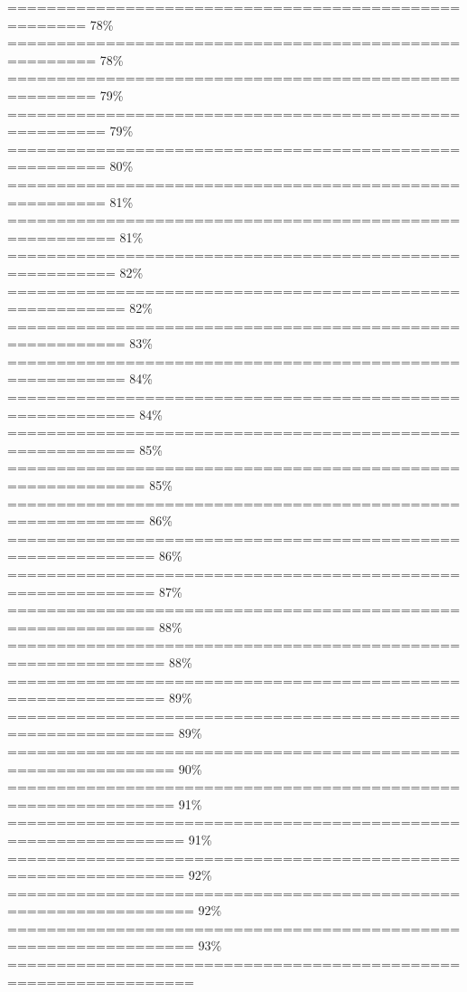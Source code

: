 \documentclass[
]{article}
\begin{document}
\textbar======================================================
\textbar{} 78\% \textbar{}
\textbar=======================================================
\textbar{} 78\% \textbar{}
\textbar=======================================================
\textbar{} 79\% \textbar{}
\textbar========================================================
\textbar{} 79\% \textbar{}
\textbar========================================================
\textbar{} 80\% \textbar{}
\textbar========================================================
\textbar{} 81\% \textbar{}
\textbar=========================================================
\textbar{} 81\% \textbar{}
\textbar=========================================================
\textbar{} 82\% \textbar{}
\textbar==========================================================
\textbar{} 82\% \textbar{}
\textbar==========================================================
\textbar{} 83\% \textbar{}
\textbar==========================================================
\textbar{} 84\% \textbar{}
\textbar===========================================================
\textbar{} 84\% \textbar{}
\textbar===========================================================
\textbar{} 85\% \textbar{}
\textbar============================================================
\textbar{} 85\% \textbar{}
\textbar============================================================
\textbar{} 86\% \textbar{}
\textbar=============================================================
\textbar{} 86\% \textbar{}
\textbar=============================================================
\textbar{} 87\% \textbar{}
\textbar=============================================================
\textbar{} 88\% \textbar{}
\textbar==============================================================
\textbar{} 88\% \textbar{}
\textbar==============================================================
\textbar{} 89\% \textbar{}
\textbar===============================================================
\textbar{} 89\% \textbar{}
\textbar===============================================================
\textbar{} 90\% \textbar{}
\textbar===============================================================
\textbar{} 91\% \textbar{}
\textbar================================================================
\textbar{} 91\% \textbar{}
\textbar================================================================
\textbar{} 92\% \textbar{}
\textbar=================================================================
\textbar{} 92\% \textbar{}
\textbar=================================================================
\textbar{} 93\% \textbar{}
\textbar=================================================================
\end{document}
